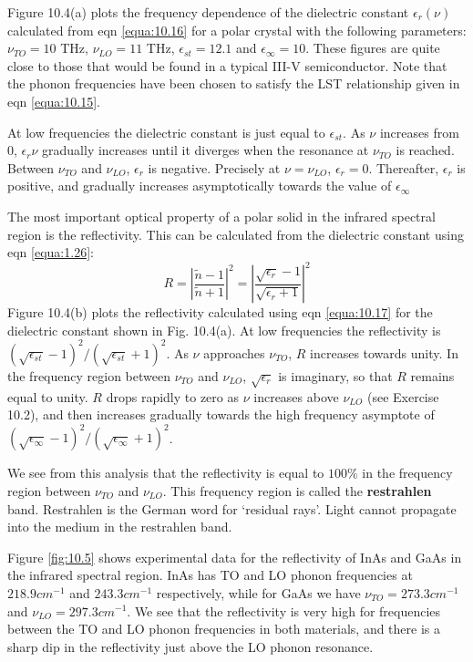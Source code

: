 \documentclass[12pt]{book}
\begin{document}
{Figure 10.4(a) plots the frequency dependence of the dielectric constant $\epsilon_r(\nu)$ calculated from eqn \ref{equa:10.16} for a polar crystal with the following parameters: $\nu_{TO} = 10$ THz, $\nu_{LO} = 11$ THz, $\epsilon_{st}=12.1$ and $\epsilon_\infty=10$. These figures are quite close to those that would be found in a typical III-V semiconductor. Note that the phonon frequencies have been chosen to satisfy the LST relationship given in eqn \ref{equa:10.15}.

At low frequencies the dielectric constant is just equal to $\epsilon_{st}$. As $\nu$ increases from 0, $\epsilon_r{\nu}$ gradually increases until it diverges when the resonance at $\nu_{TO}$ is reached. Between $\nu_{TO}$ and $\nu_{LO}$, $\epsilon_r$ is negative. Precisely at $\nu = \nu_{LO}$, $\epsilon_r=0$. Thereafter, $\epsilon_r$ is positive, and gradually increases asymptotically towards the value of $\epsilon_{\infty}$

The most important optical property of a polar solid in the infrared spectral region is the reflectivity. This can be calculated from the dielectric constant using eqn \ref{equa:1.26}:
\begin{equation}\label{equa:10.17}
  R=|\frac{\tilde{n}-1}{\tilde{n}+1}|^2=|\frac{\sqrt{\epsilon_r}-1}{\sqrt{\epsilon_r+1}}|^2
\end{equation}
Figure 10.4(b) plots the reflectivity calculated using eqn \ref{equa:10.17} for the dielectric constant shown in Fig. 10.4(a). At low frequencies the reflectivity is $(\sqrt{\epsilon_{st}}-1)^2/(\sqrt{\epsilon_{st}}+1)^2$. As $\nu$ approaches $\nu_{TO}$, $R$ increases towards unity. In the frequency region between $\nu_{TO}$ and $\nu_{LO}$, $\sqrt{\epsilon_r}$ is imaginary, so that $R$ remains equal to unity. $R$ drops rapidly to zero as $\nu$ increases above $\nu_{LO}$ (see Exercise 10.2), and then increases gradually towards the high frequency asymptote of $(\sqrt{\epsilon_{\infty}}-1)^2/(\sqrt{\epsilon_{\infty}}+1)^2$.

We see from this analysis that the reflectivity is equal to $100\%$ in the frequency region between $\nu_{TO}$ and $\nu_{LO}$. This frequency region is called the \textbf{restrahlen} band. Restrahlen is the German word for `residual rays'. Light cannot propagate into the medium in the restrahlen band.

Figure \ref{fig:10.5} shows experimental data for the reflectivity of InAs and GaAs in the infrared spectral region. InAs has TO and LO phonon frequencies at $218.9cm^{-1}$ and $243.3cm^{-1}$ respectively, while for GaAs we have $\nu_{TO} = 273.3cm^{-1}$ and $\nu_{LO}=297.3cm^{-1}$. We see that the reflectivity is very high for frequencies between the TO and LO phonon frequencies in both materials, and there is a sharp dip in the reflectivity just above the LO phonon resonance.

}
\end{document}
